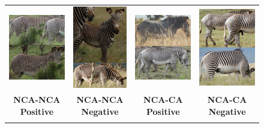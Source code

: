 \begin{figure}[!t]
    \begin{center}
        \begin{tabular}{cccc}
            \includegraphics[width=0.20\linewidth]{resources/pair-8451-14771-nca-nca-pos.pdf}  &
            \includegraphics[width=0.20\linewidth]{resources/pair-4071-4887-nca-nca-neg.pdf}   &
            \includegraphics[width=0.20\linewidth]{resources/pair-3074-7992-nca-ca-pos.pdf}    &
            \includegraphics[width=0.20\linewidth]{resources/pair-7979-12732-nca-ca-neg.pdf}     \\
            \textbf{NCA-NCA Positive}                                                          &
            \textbf{NCA-NCA Negative}                                                          &
            \textbf{NCA-CA Positive}                                                           &
            \textbf{NCA-CA Negative}                                                             \\
            \\

\end{tabular}
\end{center}
\end{figure}
